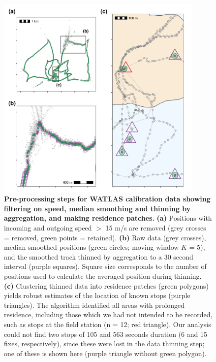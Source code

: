     \begin{figure}[ht!]
        \centering
        \includegraphics[width=0.9\textwidth]{figures/preprocessing/fig_07.png}
        \caption{
            \textbf{Pre-processing steps for WATLAS calibration data showing filtering on speed, median smoothing and thinning by aggregation, and making residence patches.}
            \textbf{(a)} Positions with incoming and outgoing speed $>$ 15 m/s are removed (grey crosses = removed, green points = retained).
            \textbf{(b)} Raw data (grey crosses), median smoothed positions (green circles; moving window $K$ = 5), and the smoothed track thinned by aggregation to a 30 second interval (purple squares).
            Square size corresponds to the number of positions used to calculate the averaged position during thinning.
            \textbf{(c)} Clustering thinned data into residence patches (green polygons) yields robust estimates of the location of known stops (purple triangles).
            The algorithm identified all areas with prolonged residence, including those which we had not intended to be recorded, such as stops at the field station (n = 12; red triangle).
            Our analysis could not find two stops of 105 and 563 seconds duration (6 and 15 fixes, respectively), since these were lost in the data thinning step; one of these is shown here (purple triangle without green polygon).
        }
        \label{preproc_fig_07}
    \end{figure}

